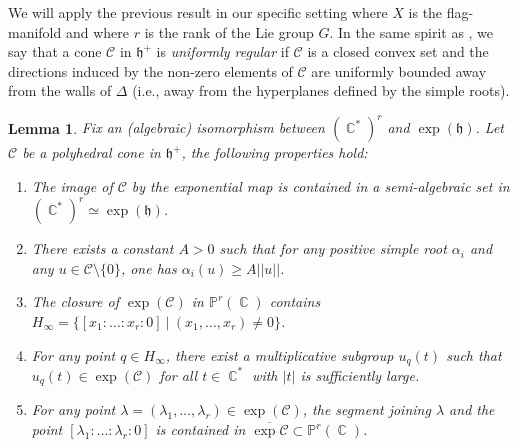\documentclass[12pt]{amsbook}%
\newtheorem{lem}[thm]{Lemma}
\theoremstyle{definition}
\theoremstyle{remark}
\numberwithin{section}{chapter}
\numberwithin{subsection}{section}
\numberwithin{figure}{chapter}
\DeclareMathOperator{\C}{\mathbb{C}}
\def\bP{{\mathbb{P}}}
\begin{document}
{{We will apply the previous result in our specific setting where $X $ is the flag-manifold and where $r$ is the rank of the Lie group $G$. 
In the same spirit as \cite[Definition 2.21]{manicures}, we say  that a cone $\mathcal{C}$ in $\mathfrak{h}^+$ is \textit{uniformly regular} if  $\mathcal{C}$ is a closed convex set and the directions induced by the non-zero elements of $\mathcal{C}$ are uniformly bounded away from the walls of $\Delta$ (i.e., away from  the hyperplanes defined by the simple roots).  


\begin{lem} \label{lem_basic_cone} Fix an (algebraic) isomorphism between $(\C^*)^r$ and $\exp(\mathfrak{h})$. Let $\mathcal{C}$ be a polyhedral cone in $\mathfrak{h}^+$, the following properties hold:  
\begin{enumerate}
\item[(i)] The image of $\mathcal{C}$ by the exponential map is contained in a semi-algebraic set in $(\C^*)^r \simeq \exp(\mathfrak{h})$. 
\item[(ii)] There exists a constant $A> 0$ such that for any positive simple root $\alpha_i$ and any $u \in \mathcal{C} \setminus \{0 \}$, one has $\alpha_i(u) \geqslant A || u||$. 
\item[(iii)] The closure of $\exp(\mathcal{C})$ in $\bP^r(\C)$ contains $H_\infty = \{ [x_1 : \ldots : x_r : 0] \ | \ (x_1, \ldots , x_r) \neq 0\}$. 
\item[(iv)] For any point $q \in H_\infty$, there exist a multiplicative subgroup $u_q(t)$ such that $u_q(t) \in \exp(\mathcal{C})$ for all   
$t\in \C^*$ with $|t | $ is sufficiently large. 
\item[(v)] For any point $\lambda = (\lambda_1 , \ldots, \lambda_r) \in \exp(\mathcal{C})$, the segment joining $\lambda$ and the point $[\lambda_1 : \ldots : \lambda_r : 0]$ is contained in $\overline{\exp{\mathcal{C}}} \subset \bP^r(\C)$.  
\end{enumerate}
\end{lem}

}}
\end{document}
